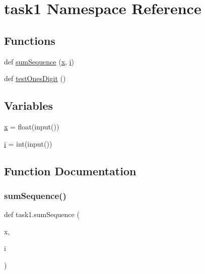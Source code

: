 \hypertarget{namespacetask1}{}\section{task1 Namespace Reference}
\label{namespacetask1}
\subsection*{Functions}
\begin{DoxyCompactItemize}
\item 
def \hyperlink{namespacetask1_adbe05b5ae98e904663746871b104a3d6}{sum\+Sequence} (\hyperlink{namespacetask1_a0d71885f905bd0d3a37229562c0cb4c7}{x}, \hyperlink{namespacetask1_aec1d455ab1e1e756d790401a19122156}{i})
\item 
def \hyperlink{namespacetask1_a0ef76409bdeb97cd3f391b65350cf56e}{test\+Ones\+Digit} ()
\end{DoxyCompactItemize}
\subsection*{Variables}
\begin{DoxyCompactItemize}
\item 
\hyperlink{namespacetask1_a0d71885f905bd0d3a37229562c0cb4c7}{x} = float(input())
\item 
\hyperlink{namespacetask1_aec1d455ab1e1e756d790401a19122156}{i} = int(input())
\end{DoxyCompactItemize}


\subsection{Function Documentation}
\mbox{\label{namespacetask1_adbe05b5ae98e904663746871b104a3d6}} 
\subsubsection{\texorpdfstring{sum\+Sequence()}{sumSequence()}}
{\footnotesize\ttfamily def task1.\+sum\+Sequence (\begin{DoxyParamCaption}\item[{}]{x,  }\item[{}]{i }\end{DoxyParamCaption})}

\mbox{\label{namespacetask1_a0ef76409bdeb97cd3f391b65350cf56e}} 
